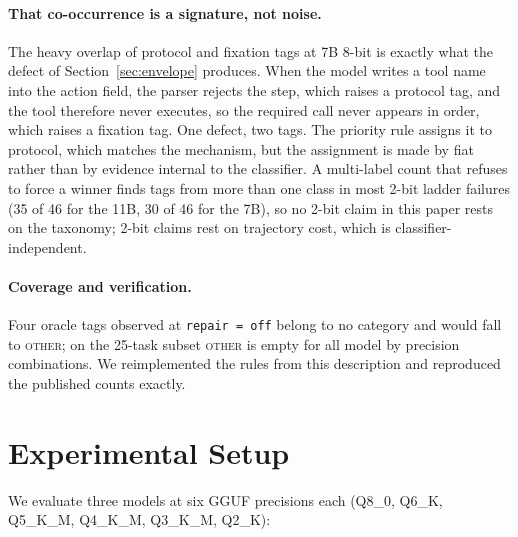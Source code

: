 \documentclass[11pt]{article}
\begin{document}
\paragraph{That co-occurrence is a signature, not noise.} The heavy overlap of protocol and fixation tags at 7B 8-bit is exactly what the defect of Section~\ref{sec:envelope} produces. When the model writes a tool name into the action field, the parser rejects the step, which raises a protocol tag, and the tool therefore never executes, so the required call never appears in order, which raises a fixation tag. One defect, two tags. The priority rule assigns it to protocol, which matches the mechanism, but the assignment is made by fiat rather than by evidence internal to the classifier. A multi-label count that refuses to force a winner finds tags from more than one class in most 2-bit ladder failures (35 of 46 for the 11B, 30 of 46 for the 7B), so no 2-bit claim in this paper rests on the taxonomy; 2-bit claims rest on trajectory cost, which is classifier-independent.

\paragraph{Coverage and verification.} Four oracle tags observed at \texttt{repair\,=\,off} belong to no category and would fall to \textsc{other}; on the 25-task subset \textsc{other} is empty for all model by precision combinations. We reimplemented the rules from this description and reproduced the published counts exactly.

\section{Experimental Setup}
\label{sec:setup}

We evaluate three models at six GGUF precisions each (Q8\_0, Q6\_K, Q5\_K\_M, Q4\_K\_M, Q3\_K\_M, Q2\_K):
\end{document}

